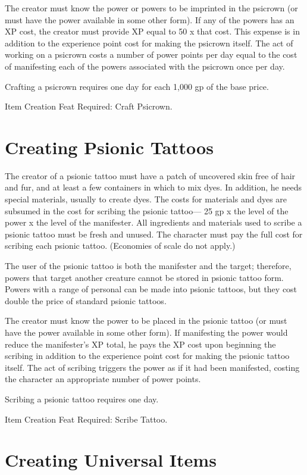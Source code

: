 \documentclass{article}
\begin{document}
The creator must know the power or powers to be imprinted in the psicrown (or must 
have the power available in some other form). If any of the powers has an XP cost, 
the creator must provide XP equal to 50 x that cost. This expense is in addition 
to the experience point cost for making the psicrown itself. The act of working 
on a psicrown costs a number of power points per day equal to the cost of manifesting 
each of the powers associated with the psicrown once per day.

Crafting a psicrown requires one day for each 1,000 gp of the base price.

Item Creation Feat Required: Craft Psicrown.

\section*{\textbf{Creating Psionic Tattoos}}

The creator of a psionic tattoo must have a patch of uncovered skin free of hair 
and fur, and at least a few containers in which to mix dyes. In addition, he needs 
special materials, usually to create dyes. The costs for materials and dyes are 
subsumed in the cost for scribing the psionic tattoo--- 25 gp x the level of the 
power x the level of the manifester. All ingredients and materials used to scribe 
a psionic tattoo must be fresh and unused. The character must pay the full cost 
for scribing each psionic tattoo. (Economies of scale do not apply.)

The user of the psionic tattoo is both the manifester and the target; therefore, 
powers that target another creature\textit{ }cannot be stored in psionic tattoo 
form. Powers with a range of personal can be made into psionic tattoos, but they 
cost double the price of standard psionic tattoos.

The creator must know the power to be placed in the psionic tattoo (or must have 
the power available in some other form). If manifesting the power would reduce 
the manifester's XP total, he pays the XP cost upon beginning the scribing in addition 
to the experience point cost for making the psionic tattoo itself. The act of scribing 
triggers the power as if it had been manifested, costing the character an appropriate 
number of power points.

Scribing a psionic tattoo requires one day.

Item Creation Feat Required: Scribe Tattoo.

\section*{\textbf{Creating Universal Items}}
\end{document}
